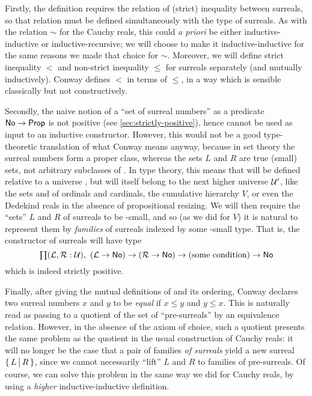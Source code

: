 Firstly, the definition requires the relation of (strict) inequality between surreals, so that relation must be defined simultaneously with the type \NO of surreals.
As with the relation $\sim$ for the Cauchy reals, this could \emph{a priori} be either inductive-inductive or inductive-recursive; we will choose to make it inductive-inductive for the same reasons we made that choice for $\sim$.
Moreover, we will define strict inequality $<$ and non-strict inequality $\le$ for surreals separately (and mutually inductively).
Conway defines $<$ in terms of $\le$, in a way which is sensible classically but not constructively.

Secondly, the naive notion of a ``set of surreal numbers'' as a predicate $\mathsf{No}\to\mathsf{Prop}$ is not positive (see \autoref{sec:strictly-positive}), hence cannot be used as input to an inductive constructor.
However, this would not be a good type-theoretic translation of what Conway means anyway, because in set theory the surreal numbers form a proper class, whereas the sets $L$ and $R$ are true (small) sets, not arbitrary subclasses of \NO.
In type theory, this means that \NO will be defined relative to a universe \UU, but will itself belong to the next higher universe $\mathcal{U}'$, like the sets \ord and \card of ordinals and cardinals, the cumulative hierarchy $V$, or even the Dedekind reals in the absence of propositional resizing.
We will then require the ``sets'' $L$ and $R$ of surreals to be \UU-small, and so (as we did for $V$) it is natural to represent them by \emph{families} of surreals indexed by some \UU-small type.
That is, the constructor of surreals will have type
\[ \prd{\LL,\RR:\UU} (\LL\to\NO) \to (\RR\to \NO) \to (\text{some condition}) \to \NO \]
which is indeed strictly positive.

Finally, after giving the mutual definitions of \NO and its ordering, Conway declares two surreal numbers $x$ and $y$ to be \emph{equal} if $x\le y$ and $y\le x$.
This is naturally read as passing to a quotient of the set of ``pre-surreals'' by an equivalence relation.
However, in the absence of the axiom of choice, such a quotient presents the same problem as the quotient in the usual construction of Cauchy reals: it will no longer be the case that a pair of families \emph{of surreals} yield a new surreal $\{\,L\,\big|\,R\,\}$, since we cannot necessarily ``lift'' $L$ and $R$ to families of pre-surreals.
Of course, we can solve this problem in the same way we did for Cauchy reals, by using a \emph{higher} inductive-inductive definition.

